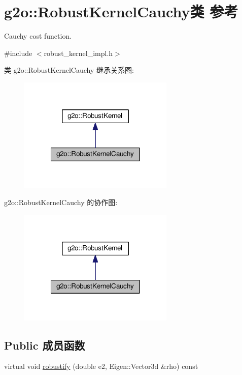 \hypertarget{classg2o_1_1RobustKernelCauchy}{\section{g2o\-:\-:Robust\-Kernel\-Cauchy类 参考}
\label{classg2o_1_1RobustKernelCauchy}
}


Cauchy cost function.  




{\ttfamily \#include $<$robust\-\_\-kernel\-\_\-impl.\-h$>$}



类 g2o\-:\-:Robust\-Kernel\-Cauchy 继承关系图\-:
\nopagebreak
\begin{figure}[H]
\begin{center}
\leavevmode
\includegraphics[width=210pt]{classg2o_1_1RobustKernelCauchy__inherit__graph}
\end{center}
\end{figure}


g2o\-:\-:Robust\-Kernel\-Cauchy 的协作图\-:
\nopagebreak
\begin{figure}[H]
\begin{center}
\leavevmode
\includegraphics[width=210pt]{classg2o_1_1RobustKernelCauchy__coll__graph}
\end{center}
\end{figure}
\subsection*{Public 成员函数}
\begin{DoxyCompactItemize}
\item 
virtual void \hyperlink{classg2o_1_1RobustKernelCauchy_adfe1678456e327b1a8a33f5b8b499493}{robustify} (double e2, Eigen\-::\-Vector3d \&rho) const 
\end{DoxyCompactItemize}
